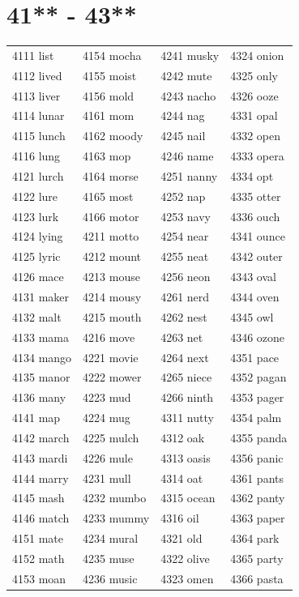 \documentclass[12pt, oneside]{book}
\begin{document}
	\begin{table}[h]
		\centering
		\section*{41** - 43**}
		\begin{tabular}{l l l l}
			4111 list & 4154 mocha & 4241 musky & 4324 onion\\
			4112 lived & 4155 moist & 4242 mute & 4325 only\\
			4113 liver & 4156 mold & 4243 nacho & 4326 ooze\\
			4114 lunar & 4161 mom & 4244 nag & 4331 opal\\
			4115 lunch & 4162 moody & 4245 nail & 4332 open\\
			4116 lung & 4163 mop & 4246 name & 4333 opera\\
			4121 lurch & 4164 morse & 4251 nanny & 4334 opt\\
			4122 lure & 4165 most & 4252 nap & 4335 otter\\
			4123 lurk & 4166 motor & 4253 navy & 4336 ouch\\
			4124 lying & 4211 motto & 4254 near & 4341 ounce\\
			4125 lyric & 4212 mount & 4255 neat & 4342 outer\\
			4126 mace & 4213 mouse & 4256 neon & 4343 oval\\
			4131 maker & 4214 mousy & 4261 nerd & 4344 oven\\
			4132 malt & 4215 mouth & 4262 nest & 4345 owl\\
			4133 mama & 4216 move & 4263 net & 4346 ozone\\
			4134 mango & 4221 movie & 4264 next & 4351 pace\\
			4135 manor & 4222 mower & 4265 niece & 4352 pagan\\
			4136 many & 4223 mud & 4266 ninth & 4353 pager\\
			4141 map & 4224 mug & 4311 nutty & 4354 palm\\
			4142 march & 4225 mulch & 4312 oak & 4355 panda\\
			4143 mardi & 4226 mule & 4313 oasis & 4356 panic\\
			4144 marry & 4231 mull & 4314 oat & 4361 pants\\
			4145 mash & 4232 mumbo & 4315 ocean & 4362 panty\\
			4146 match & 4233 mummy & 4316 oil & 4363 paper\\
			4151 mate & 4234 mural & 4321 old & 4364 park\\
			4152 math & 4235 muse & 4322 olive & 4365 party\\
			4153 moan & 4236 music & 4323 omen & 4366 pasta\\
			
		\end{tabular}
	\end{table}
	
\end{document}
